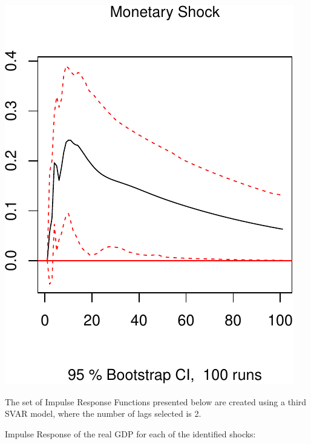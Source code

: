 \documentclass[11pt,preprint, authoryear]{elsarticle}
\numberwithin{equation}{section}
\numberwithin{figure}{section}
\numberwithin{table}{section}
\begin{document}
\includegraphics{TS_proj_files/figure-latex/unnamed-chunk-32-3.pdf}

The set of Impulse Response Functions presented below are created using
a third SVAR model, where the number of lags selected is 2.

Impulse Response of the real GDP for each of the identified shocks:
\end{document}

